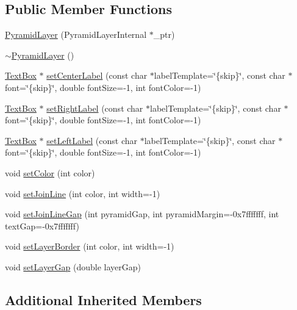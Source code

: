 \subsection*{Public Member Functions}
\begin{DoxyCompactItemize}
\item 
\hyperlink{class_pyramid_layer_a639827a87718856f55386209e7899075}{Pyramid\+Layer} (Pyramid\+Layer\+Internal $\ast$\+\_\+ptr)
\item 
\hyperlink{class_pyramid_layer_a380560a81da3bb2ec794ca70eebb2587}{$\sim$\+Pyramid\+Layer} ()
\item 
\hyperlink{class_text_box}{Text\+Box} $\ast$ \hyperlink{class_pyramid_layer_a070a63da35f3b3fb71a06223c2ddb144}{set\+Center\+Label} (const char $\ast$label\+Template=\char`\"{}\{skip\}\char`\"{}, const char $\ast$font=\char`\"{}\{skip\}\char`\"{}, double font\+Size=-\/1, int font\+Color=-\/1)
\item 
\hyperlink{class_text_box}{Text\+Box} $\ast$ \hyperlink{class_pyramid_layer_ab9f1119330312a09c4a9b02681cdb955}{set\+Right\+Label} (const char $\ast$label\+Template=\char`\"{}\{skip\}\char`\"{}, const char $\ast$font=\char`\"{}\{skip\}\char`\"{}, double font\+Size=-\/1, int font\+Color=-\/1)
\item 
\hyperlink{class_text_box}{Text\+Box} $\ast$ \hyperlink{class_pyramid_layer_a47110e38cda797ccd23c9dd37bac8d80}{set\+Left\+Label} (const char $\ast$label\+Template=\char`\"{}\{skip\}\char`\"{}, const char $\ast$font=\char`\"{}\{skip\}\char`\"{}, double font\+Size=-\/1, int font\+Color=-\/1)
\item 
void \hyperlink{class_pyramid_layer_a01e46a444b4b81a0753aa6068e88e94d}{set\+Color} (int color)
\item 
void \hyperlink{class_pyramid_layer_ae9339f4fc54d82299e5d392ccbe87af3}{set\+Join\+Line} (int color, int width=-\/1)
\item 
void \hyperlink{class_pyramid_layer_ae69f1b839b4c61ebd05d9674b5022f4c}{set\+Join\+Line\+Gap} (int pyramid\+Gap, int pyramid\+Margin=-\/0x7fffffff, int text\+Gap=-\/0x7fffffff)
\item 
void \hyperlink{class_pyramid_layer_a0501abd3ffb21f08fc4f57f6cb6c2d62}{set\+Layer\+Border} (int color, int width=-\/1)
\item 
void \hyperlink{class_pyramid_layer_abece35f4e8b47f64c7d7fa1ed45d4281}{set\+Layer\+Gap} (double layer\+Gap)
\end{DoxyCompactItemize}
\subsection*{Additional Inherited Members}


